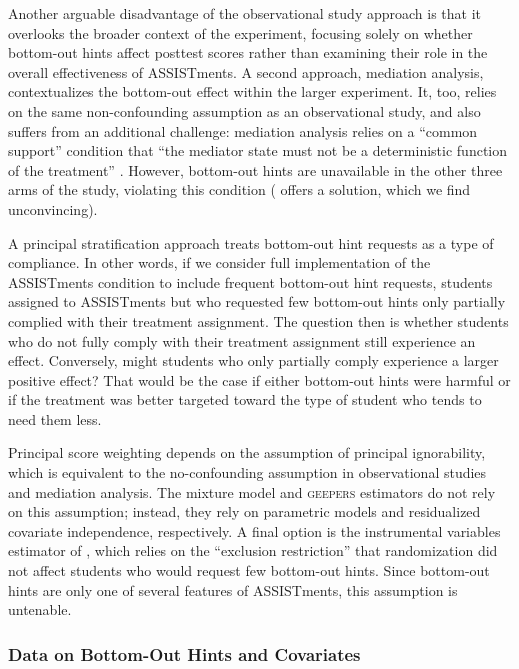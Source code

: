 \documentclass[]{article}
\begin{document}
Another arguable disadvantage of the observational study approach is that it overlooks the broader context of the experiment, focusing solely on whether bottom-out hints affect posttest scores rather than examining their role in the overall effectiveness of ASSISTments.
A second approach, mediation analysis, contextualizes the bottom-out effect within the larger experiment.
It, too, relies on the same non-confounding assumption as an observational study, and also suffers from an additional challenge: mediation analysis relies on a ``common support'' condition that ``the mediator state must not be a deterministic function of the treatment'' \citep[p. 225]{celli2022causal}.
However, bottom-out hints are unavailable in the other three arms of the study, violating this condition (\citealt{sales2021student} offers a solution, which we find unconvincing).

A principal stratification approach treats bottom-out hint requests as a type of compliance.
In other words, if we consider full implementation of the ASSISTments condition to include frequent bottom-out hint requests, students assigned to ASSISTments but who requested few bottom-out hints only partially complied with their treatment assignment.
The question then is whether students who do not fully comply with their treatment assignment still experience an effect.
Conversely, might students who only partially comply experience a larger positive effect?
That would be the case if either bottom-out hints were harmful or if the treatment was better targeted toward the type of student who tends to need them less.

Principal score weighting depends on the assumption of principal ignorability, which is equivalent to the no-confounding assumption in observational studies and mediation analysis.
The mixture model and \textsc{geepers} estimators do not rely on this assumption; instead, they rely on parametric models and residualized covariate independence, respectively.
A final option is the instrumental variables estimator of \citet{air}, which relies on the ``exclusion restriction'' that randomization did not affect students who would request few bottom-out hints.
Since bottom-out hints are only one of several features of ASSISTments, this assumption is untenable. 


\subsubsection{Data on Bottom-Out Hints and Covariates}
\end{document}
